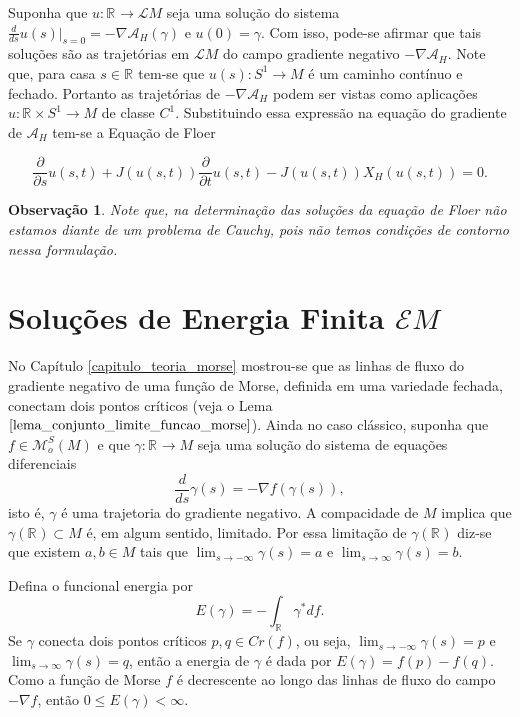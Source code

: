 \documentclass[12pt]{book}
\newtheorem{observacao}[teorema]{Observação}
\newcommand{\campohamiltoniano}[1]{X_{H}(#1)}
\newcommand{\circulo}{S^{1}}
\newcommand{\derivada}[2]{\frac{d #1}{d #2}}
\newcommand{\derivadaparcial}[2]{\frac{\partial #1}{\partial #2}}
\newcommand{\energiafinitaM}{\mathcal{E}M}
\newcommand{\funcionalH}{\mathcal{A}_{H}}
\newcommand{\funcoesmorsesmale}[1]{\mathcal{M}^{S}_{o}(#1)}
\newcommand{\gradiente}{\nabla f}
\newcommand{\gradientefuncional}{\nabla \funcionalH}
\newcommand{\pontoscriticos}[1]{\textit{Cr}(#1)}
\newcommand{\retacartesianocirculo}{\real{} \times \circulo}
\newcommand{\real}[1]{\mathbb{R}^{#1}}
\newcommand{\reta}{\real{}}
\newcommand{\lacocontrateis}{\mathcal{L}M}
\begin{document}
	Suponha que $u :\reta\to \lacocontrateis$ seja uma solução do sistema $\derivada{}{s}u(s)|_{s=0} = -\gradientefuncional(\gamma)$ e $u(0)=\gamma$. Com isso, pode-se afirmar que tais soluções são as trajetórias em $\lacocontrateis$ do campo gradiente negativo $-\gradientefuncional$. Note que, para casa $s\in \reta$ tem-se que $u(s):\circulo\to M$ é um caminho contínuo e fechado. Portanto as trajetórias de $-\gradientefuncional$ podem ser vistas como aplicações $u:\retacartesianocirculo \to M$ de classe $C^{1}$. Substituindo essa expressão na equação do gradiente de $\funcionalH$ tem-se a Equação de Floer
	
	$$
	\derivadaparcial{}{s}u(s,t) + J(u(s,t))\derivadaparcial{}{t}u(s,t) -J(u(s,t)) \campohamiltoniano{u(s,t)}=0. 
	$$
	
	\begin{observacao}
		Note que, na determinação das soluções da equação de Floer não estamos diante de um problema de Cauchy, pois não temos condições de contorno nessa formulação.
	\end{observacao}
		
	\section{Soluções de Energia Finita $\energiafinitaM$}\label{secao_funcional_energia}
	
	No Capítulo \ref{capitulo_teoria_morse} mostrou-se que as linhas de fluxo do gradiente negativo de uma função de Morse, definida em uma variedade fechada, conectam dois pontos críticos (veja o Lema $\ref{lema_conjunto_limite_funcao_morse}$). Ainda no caso clássico, suponha que $f \in \funcoesmorsesmale{M}$ e que $\gamma:\reta \to M$ seja uma solução do sistema de equações diferenciais
	$$
	\derivada{}{s}\gamma(s)=-\gradiente(\gamma(s)),
	$$
	isto é, $\gamma$ é uma trajetoria do gradiente negativo. A compacidade de $M$ implica que $\gamma(\reta) \subset M$ é, em algum sentido, limitado. Por essa limitação de $\gamma(\reta)$ diz-se que existem $a, b \in M$ tais que $\lim_{s\to -\infty}\gamma(s)=a$ e $\lim_{s\to \infty}\gamma(s)=b$. 
	
	Defina o funcional energia por
	$$
	E(\gamma)= -\int_{\reta}\gamma^{*} df.
	$$
	Se $\gamma$ conecta dois pontos críticos $p,q\in \pontoscriticos{f}$, ou seja, $\lim_{s\to -\infty}\gamma(s)=p$ e $\lim_{s\to \infty}\gamma(s)=q$, então a energia de $\gamma$ é dada por $E(\gamma) = f(p) -f(q)$. Como a função de Morse $f$ é decrescente ao longo das linhas de fluxo do campo $-\gradiente$, então $0\leq E(\gamma)<\infty$.
	
\end{document}
